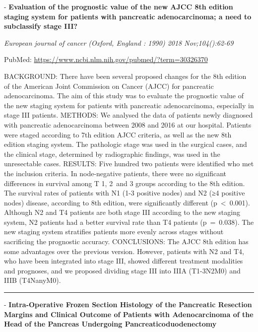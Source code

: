 \documentclass[]{article}
\begin{document}
 - \textbf{Evaluation of the prognostic value of the new AJCC 8th
edition staging system for patients with pancreatic adenocarcinoma; a
need to subclassify stage III?}

\emph{European journal of cancer (Oxford, England : 1990) 2018
Nov;104():62-69}

PubMed: \url{https://www.ncbi.nlm.nih.gov/pubmed/?term=30326370}

BACKGROUND: There have been several proposed changes for the 8th edition
of the American Joint Commission on Cancer (AJCC) for pancreatic
adenocarcinoma. The aim of this study was to evaluate the prognostic
value of the new staging system for patients with pancreatic
adenocarcinoma, especially in stage III patients. METHODS: We analysed
the data of patients newly diagnosed with pancreatic adenocarcinoma
between 2008 and 2016 at our hospital. Patients were staged according to
7th edition AJCC criteria, as well as the new 8th edition staging
system. The pathologic stage was used in the surgical cases, and the
clinical stage, determined by radiographic findings, was used in the
unresectable cases. RESULTS: Five hundred two patients were identified
who met the inclusion criteria. In node-negative patients, there were no
significant differences in survival among T 1, 2~and 3 groups according
to the 8th edition. The survival rates of patients with N1 (1-3 positive
nodes) and N2 (≥4 positive nodes) disease, according to 8th edition,
were significantly different (p~\textless{}~0.001). Although N2 and T4
patients are both stage III according to the new staging system, N2
patients had a better survival rate than T4 patients (p~=~0.038). The
new staging system stratifies patients more evenly across stages without
sacrificing the prognostic accuracy. CONCLUSIONS: The AJCC 8th edition
has some advantages over the previous version. However, patients with N2
and T4, who have been integrated into stage III, showed different
treatment modalities and prognoses, and we proposed dividing stage III
into IIIA (T1-3N2M0) and IIIB (T4NanyM0).

{}

{}

\begin{center}\rule{0.5\linewidth}{\linethickness}\end{center}

 - \textbf{Intra-Operative Frozen Section Histology of the Pancreatic
Resection Margins and Clinical Outcome of Patients with Adenocarcinoma
of the Head of the Pancreas Undergoing Pancreaticoduodenectomy}
\end{document}
